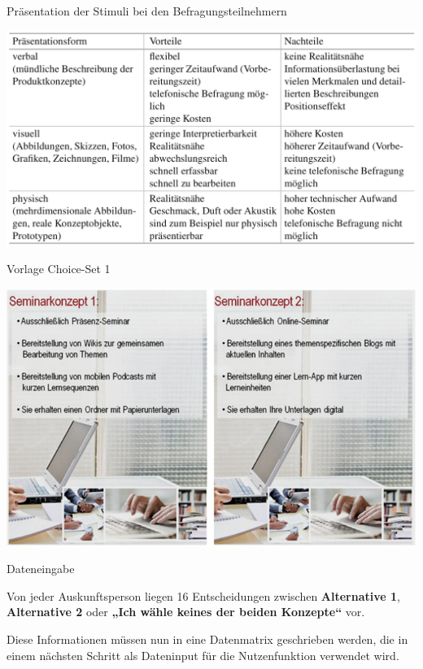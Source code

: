 \documentclass[12pt,ngerman,a4paper,ignorenonframetext,]{beamer}
\begin{document}
\begin{frame}{Präsentation der Stimuli bei den Befragungsteilnehmern}
\protect\hypertarget{prasentation-der-stimuli-bei-den-befragungsteilnehmern}{}

\begin{center}\includegraphics[width=0.8\linewidth]{./images/Marketingcontrolling/Stimuli} \end{center}

\end{frame}

\begin{frame}{Vorlage Choice-Set 1}
\protect\hypertarget{vorlage-choice-set-1}{}

\begin{center}\includegraphics[width=0.8\linewidth]{./images/Marketingcontrolling/Choice-Set1} \end{center}

\end{frame}

\begin{frame}{Dateneingabe}
\protect\hypertarget{dateneingabe}{}

Von jeder Auskunftsperson liegen 16 Entscheidungen zwischen
\textbf{Alternative 1}, \textbf{Alternative 2} oder \textbf{„Ich wähle
keines der beiden Konzepte``} vor.

Diese Informationen müssen nun in eine Datenmatrix geschrieben werden,
die in einem nächsten Schritt als Dateninput für die Nutzenfunktion
verwendet wird.

\end{frame}
\end{document}
